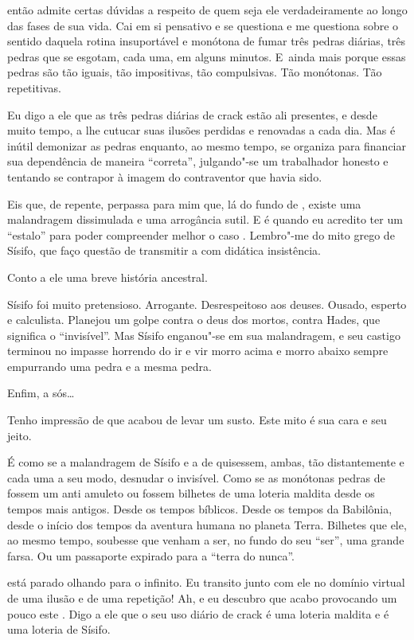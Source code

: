  então admite certas dúvidas a respeito de quem seja ele
verdadeiramente ao longo das fases de sua vida. Cai em si pensativo e se
questiona e me questiona sobre o sentido daquela rotina insuportável e
monótona de fumar três pedras diárias, três pedras que se esgotam, cada
uma, em alguns minutos. E~ainda mais porque essas pedras são tão iguais,
tão impositivas, tão compulsivas. Tão monótonas. Tão repetitivas.

Eu digo a ele que as três pedras diárias de crack estão ali presentes, e
desde muito tempo, a lhe cutucar suas ilusões perdidas e renovadas a
cada dia. Mas é inútil demonizar as pedras enquanto, ao mesmo tempo, 
se organiza para financiar sua dependência de maneira ``correta'',
julgando"-se um trabalhador honesto e tentando se contrapor à imagem do
contraventor que havia sido.

Eis que, de repente, perpassa para mim que, lá do fundo de , existe
uma malandragem dissimulada e uma arrogância sutil. E é quando eu
acredito ter um ``estalo'' para poder compreender melhor o caso .
Lembro"-me do mito grego de Sísifo, que faço questão de transmitir a 
com didática insistência.

Conto a ele uma breve história ancestral.

Sísifo foi muito pretensioso. Arrogante. Desrespeitoso aos deuses.
Ousado, esperto e calculista. Planejou um golpe contra o deus dos
mortos, contra Hades, que significa o ``invisível''. Mas Sísifo
enganou"-se em sua malandragem, e seu castigo terminou no impasse
horrendo do ir e vir morro acima e morro abaixo sempre empurrando uma
pedra e a mesma pedra.

Enfim, a sós…

Tenho impressão de que  acabou de levar um susto. Este mito é sua cara
e seu jeito.

É como se a malandragem de Sísifo e a de  quisessem, ambas, tão
distantemente e cada uma a seu modo, desnudar o invisível. Como se as
monótonas pedras de  fossem um anti amuleto ou fossem bilhetes de uma
loteria maldita desde os tempos mais antigos. Desde os tempos bíblicos.
Desde os tempos da Babilônia, desde o início dos tempos da aventura
humana no planeta Terra. Bilhetes que ele, ao mesmo tempo, soubesse que
venham a ser, no fundo do seu ``ser'', uma grande farsa. Ou um
passaporte expirado para a ``terra do nunca''.

 está parado olhando para o infinito. Eu transito junto com ele no
domínio virtual de uma ilusão e de uma repetição! Ah, e eu descubro que
acabo provocando um pouco este . Digo a ele que o seu uso diário de
crack é uma loteria maldita e é uma loteria de Sísifo.


